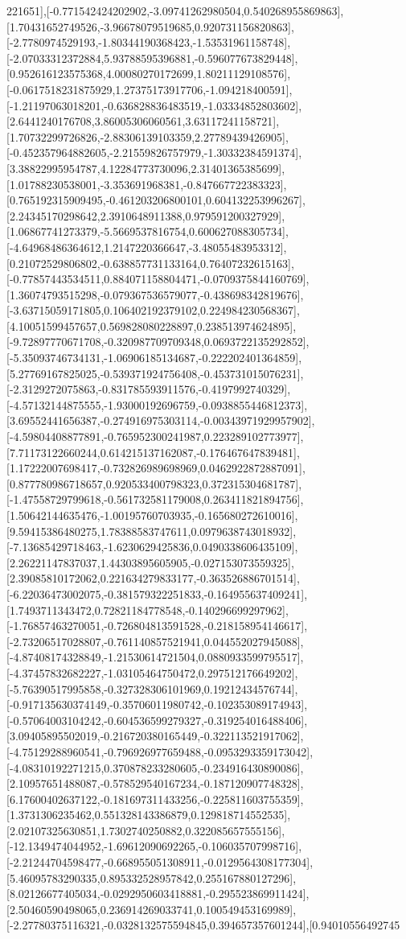 \documentclass{article}
\begin{document}
221651],[-0.771542424202902,-3.09741262980504,0.540268955869863],[1.70431652749526,-3.96678079519685,0.920731156820863],[-2.7780974529193,-1.80344190368423,-1.53531961158748],[-2.07033312372884,5.93788595396881,-0.596077673829448],[0.952616123575368,4.00080270172699,1.80211129108576],[-0.0617518231875929,1.27375173917706,-1.094218400591],[-1.21197063018201,-0.636828836483519,-1.03334852803602],[2.6441240176708,3.86005306060561,3.63117241158721],[1.70732299726826,-2.88306139103359,2.27789439426905],[-0.452357964882605,-2.21559826757979,-1.30332384591374],[3.38822995954787,4.12284773730096,2.31401365385699],[1.01788230538001,-3.353691968381,-0.847667722383323],[0.765192315909495,-0.461203206800101,0.604132253996267],[2.24345170298642,2.3910648911388,0.979591200327929],[1.06867741273379,-5.5669537816754,0.600627088305734],[-4.64968486364612,1.2147220366647,-3.48055483953312],[0.21072529806802,-0.638857731133164,0.76407232615163],[-0.77857443534511,0.884071158804471,-0.0709375844160769],[1.36074793515298,-0.079367536579077,-0.438698342819676],[-3.63715059171805,0.106402192379102,0.224984230568367],[4.10051599457657,0.569828080228897,0.238513974624895],[-9.72897770671708,-0.320987709709348,0.0693722135292852],[-5.35093746734131,-1.06906185134687,-0.222202401364859],[5.27769167825025,-0.539371924756408,-0.453731015076231],[-2.3129272075863,-0.831785593911576,-0.4197992740329],[-4.57132144875555,-1.93000192696759,-0.0938855446812373],[3.69552441656387,-0.274916975303114,-0.00343971929957902],[-4.59804408877891,-0.765952300241987,0.223289102773977],[7.71173122660244,0.614215137162087,-0.176467647839481],[1.17222007698417,-0.732826989698969,0.0462922872887091],[0.877780986718657,0.920533400798323,0.372315304681787],[-1.47558729799618,-0.561732581179008,0.263411821894756],[1.50642144635476,-1.00195760703935,-0.165680272610016],[9.59415386480275,1.78388583747611,0.0979638743018932],[-7.13685429718463,-1.6230629425836,0.0490338606435109],[2.26221147837037,1.44303895605905,-0.027153073559325],[2.39085810172062,0.221634279833177,-0.363526886701514],[-6.22036473002075,-0.381579322251833,-0.164955637409241],[1.7493711343472,0.72821184778548,-0.140296699297962],[-1.76857463270051,-0.726804813591528,-0.218158954146617],[-2.73206517028807,-0.761140857521941,0.044552027945088],[-4.87408174328849,-1.21530614721504,0.0880933599795517],[-4.37457832682227,-1.03105464750472,0.297512176649202],[-5.76390517995858,-0.327328306101969,0.19212434576744],[-0.917135630374149,-0.35706011980742,-0.102353089174943],[-0.57064003104242,-0.604536599279327,-0.319254016488406],[3.09405895502019,-0.216720380165449,-0.322113521917062],[-4.75129288960541,-0.796926977659488,-0.0953293359173042],[-4.08310192271215,0.370878233280605,-0.234916430890086],[2.10957651488087,-0.578529540167234,-0.187120907748328],[6.17600402637122,-0.181697311433256,-0.225811603755359],[1.3731306235462,0.551328143386879,0.129818714552535],[2.02107325630851,1.7302740250882,0.322085657555156],[-12.1349474044952,-1.69612090692265,-0.106035707998716],[-2.21244704598477,-0.668955051308911,-0.0129564308177304],[5.46095783290335,0.895332528957842,0.255167880127296],[8.02126677405034,-0.0292950603418881,-0.295523869911424],[2.50460590498065,0.236914269033741,0.100549453169989],[-2.27780375116321,-0.0328132575594845,0.394657357601244],[0.94010556492745
\end{document}
